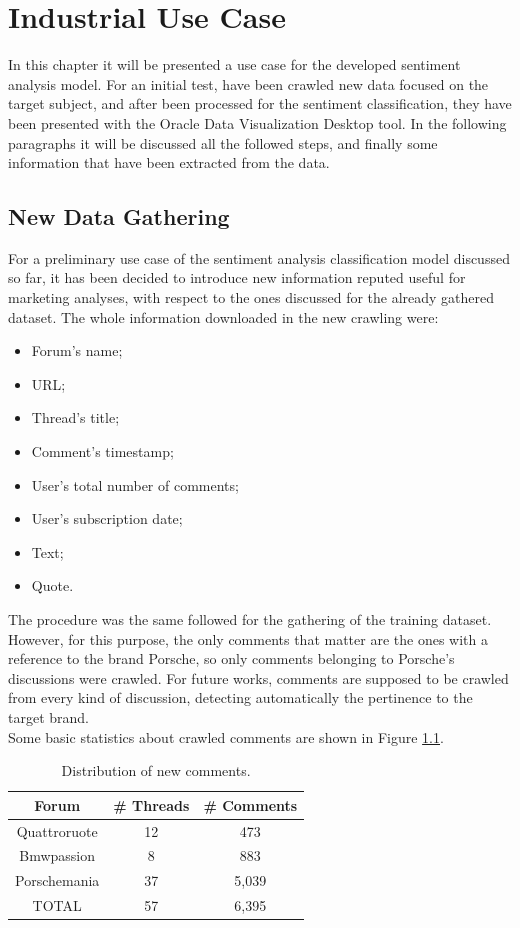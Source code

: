 \chapter{Industrial Use Case}
\label{industrial-use-case}

In this chapter it will be presented a use case for the developed sentiment analysis model. For an initial test, have been crawled new data focused on the target subject, and after been processed for the sentiment classification, they have been presented with the Oracle Data Visualization Desktop tool. In the following paragraphs it will be discussed all the followed steps, and finally some information that have been extracted from the data.

\section{New Data Gathering}

For a preliminary use case of the sentiment analysis classification model discussed so far, it has been decided to introduce new information reputed useful for marketing analyses, with respect to the ones discussed for the already gathered dataset. The whole information downloaded in the new crawling were:
\begin{itemize}
	\item Forum's name;
	\item URL;
	\item Thread's title;
	\item Comment's timestamp;
	\item User's total number of comments;
	\item User's subscription date;
	\item Text;
	\item Quote.
\end{itemize}

The procedure was the same followed for the gathering of the training dataset. However, for this purpose, the only comments that matter are the ones with a reference to the brand Porsche, so only comments belonging to Porsche's discussions were crawled. For future works, comments are supposed to be crawled from every kind of discussion, detecting automatically the pertinence to the target brand.\\
Some basic statistics about crawled comments are shown in Figure \ref{table:new-comments-test}.

\begin{table}[H]
	\centering
	\begin{tabular}{ | c | c | c | } 
		\hline
		\textbf{Forum} & \textbf{\# Threads} & \textbf{\# Comments}\\
		\hline
		Quattroruote & 12 & 473 \\
		\hline
		Bmwpassion & 8 & 883 \\
		\hline
		Porschemania & 37 & 5,039 \\
		\hline
		\hline
		TOTAL & 57 & 6,395 \\
		\hline		
	\end{tabular}
	\caption{Distribution of new comments.}
	\label{table:new-comments-test}
\end{table}


